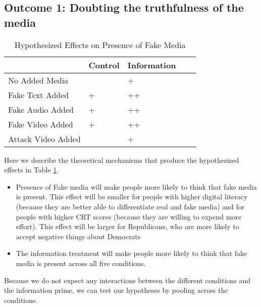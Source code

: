 
\subsection{Outcome 1: Doubting the truthfulness of the media}


\clearpage
\begin{table}[]
\caption{Hypothesized Effects on Presence of Fake Media \label{H1}}
\begin{tabular}{l|llll}
 & Control  & Information &   \\
\hline
No Added Media &  & + &    \\
Fake Text Added & +  & ++  &  \\
Fake Audio Added & +  & ++  &  \\
Fake Video Added & + & ++ &   \\
Attack Video Added &  & + &   
\end{tabular}
\end{table}


Here we describe the theoretical mechanisms that produce the hypothesized effects in Table \ref{H1}.

\begin{itemize}
       \item Presence of Fake media will make people more likely to think that fake media is present. This effect will be smaller for people with higher digital literacy (because they are better able to differentiate real and fake media) and for people with higher CRT scores (because they are willing to expend more effort). This effect will be larger for Republicans, who are more likely to accept negative things about Democrats 
    \item The information treatment will make people more likely to think that fake media is present across all five conditions.

\end{itemize}



Because we do not expect any interactions between the different conditions and the information prime, we can test our hypotheses by pooling across the conditions. 


